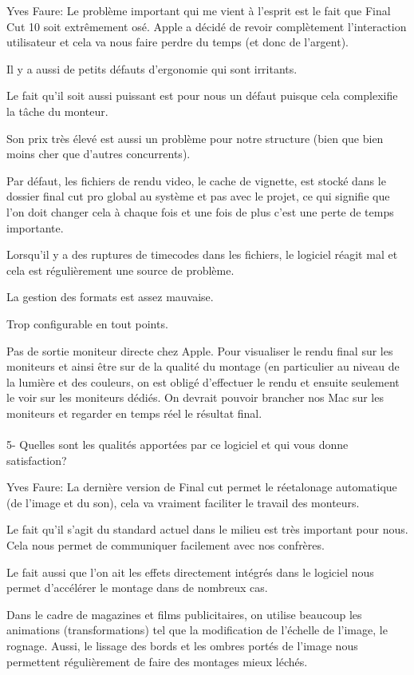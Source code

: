 Yves Faure: Le problème important qui me vient à l'esprit est le fait que Final Cut 10 soit
extrêmement osé. Apple a décidé de revoir complètement l'interaction
utilisateur et cela va nous faire perdre du temps (et donc de l'argent).

Il y a aussi de petits défauts d'ergonomie qui sont irritants.

Le fait qu'il soit aussi puissant est pour nous un défaut puisque cela
complexifie la tâche du monteur.

Son prix très élevé est aussi un problème pour notre structure (bien que bien
moins cher que d'autres concurrents).

Par défaut, les fichiers de rendu video, le cache de vignette, est stocké dans
le dossier final cut pro global au  système et pas avec le projet, ce qui
signifie que l'on doit changer cela à chaque fois et une fois de plus c'est une
perte de temps importante.

Lorsqu'il y a des ruptures de timecodes dans les fichiers, le logiciel réagit mal
et cela est régulièrement une source de problème.

La gestion des formats est assez mauvaise.

Trop configurable en tout points.

Pas de sortie moniteur directe chez Apple. Pour visualiser le rendu final sur les
moniteurs et ainsi être sur de la qualité du montage (en particulier au niveau de
la lumière et des couleurs, on est obligé d'effectuer le rendu et ensuite
seulement le voir sur les moniteurs dédiés. On devrait pouvoir brancher nos Mac
sur les moniteurs et regarder en temps réel le résultat final.

\paragraph{}
5- Quelles sont les qualités apportées par ce logiciel et qui vous donne satisfaction?

Yves Faure: La dernière version de Final cut permet le réetalonage automatique (de l'image
et du son), cela va vraiment faciliter le travail des monteurs.

Le fait qu'il s'agit du standard actuel dans le milieu est très important pour
nous. Cela nous permet de communiquer facilement avec nos confrères.

Le fait aussi que l'on ait les effets directement intégrés dans le logiciel nous
permet d'accélérer le montage dans de nombreux cas.

Dans le cadre de magazines et films publicitaires, on utilise beaucoup les
animations (transformations) tel que la modification de l'échelle de l'image,
le rognage. Aussi, le lissage des bords et les ombres portés de l'image nous
permettent régulièrement de faire des montages mieux léchés.


